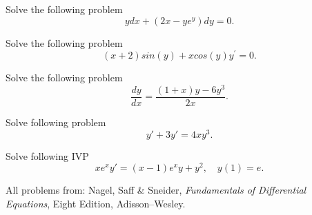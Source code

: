 \documentclass[11pt]{article}
\begin{document}
\begin{problem}
Solve the following problem
\begin{equation*}
ydx + (2x - y e^{y}) dy = 0.
\end{equation*}
\end{problem}


\begin{problem}
Solve the following problem
\begin{equation*}
\left( x + 2 \right) sin(y) + x cos(y) y^{\prime} = 0.
\end{equation*}
\end{problem}



\begin{problem}
Solve the following problem
\begin{equation*}
     \frac{dy}{dx}=\frac{(1+x)y-6y^{3}}{2x}.
\end{equation*}
\end{problem}




\begin{problem}
Solve following problem
\begin{equation*}
      y'+3y'=4xy^{3}.
\end{equation*}
\end{problem}


\begin{problem}
Solve following IVP
\begin{equation*}
      xe^{x}y' = (x-1)e^{x}y+y^{2}, \quad y(1)=e.
\end{equation*}
\end{problem}







\LabSolutions

All problems from: Nagel, Saff \& Sneider, \textit{Fundamentals of Differential Equations}, Eight Edition, Adisson--Wesley.
\end{document}
